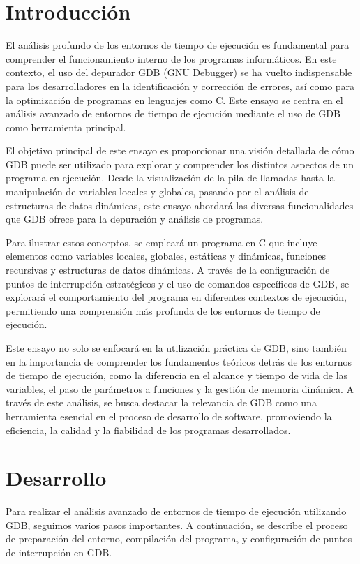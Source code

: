 \documentclass[12pt,a4paper]{article}
\begin{document}
\section{Introducción}

El análisis profundo de los entornos de tiempo de ejecución es fundamental para comprender el funcionamiento interno de los programas informáticos. En este contexto, el uso del depurador GDB (GNU Debugger) se ha vuelto indispensable para los desarrolladores en la identificación y corrección de errores, así como para la optimización de programas en lenguajes como C. Este ensayo se centra en el análisis avanzado de entornos de tiempo de ejecución mediante el uso de GDB como herramienta principal.

El objetivo principal de este ensayo es proporcionar una visión detallada de cómo GDB puede ser utilizado para explorar y comprender los distintos aspectos de un programa en ejecución. Desde la visualización de la pila de llamadas hasta la manipulación de variables locales y globales, pasando por el análisis de estructuras de datos dinámicas, este ensayo abordará las diversas funcionalidades que GDB ofrece para la depuración y análisis de programas.

Para ilustrar estos conceptos, se empleará un programa en C que incluye elementos como variables locales, globales, estáticas y dinámicas, funciones recursivas y estructuras de datos dinámicas. A través de la configuración de puntos de interrupción estratégicos y el uso de comandos específicos de GDB, se explorará el comportamiento del programa en diferentes contextos de ejecución, permitiendo una comprensión más profunda de los entornos de tiempo de ejecución.

Este ensayo no solo se enfocará en la utilización práctica de GDB, sino también en la importancia de comprender los fundamentos teóricos detrás de los entornos de tiempo de ejecución, como la diferencia en el alcance y tiempo de vida de las variables, el paso de parámetros a funciones y la gestión de memoria dinámica. A través de este análisis, se busca destacar la relevancia de GDB como una herramienta esencial en el proceso de desarrollo de software, promoviendo la eficiencia, la calidad y la fiabilidad de los programas desarrollados.
\newpage
\section{Desarrollo}
Para realizar el análisis avanzado de entornos de tiempo de ejecución utilizando GDB, seguimos varios pasos importantes. A continuación, se describe el proceso de preparación del entorno, compilación del programa, y configuración de puntos de interrupción en GDB.
\end{document}
